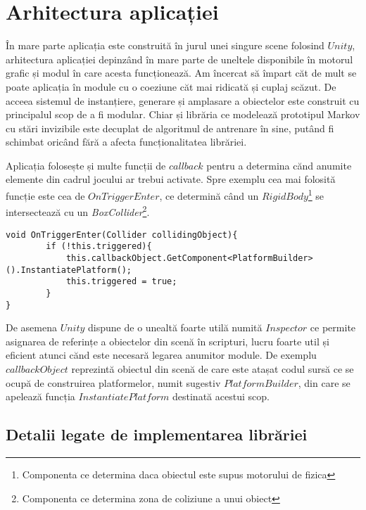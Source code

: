 \chapter{Arhitectura aplicației}

În mare parte aplicația este construită în jurul unei singure scene folosind $Unity$, arhitectura aplicației depinzând în mare parte de uneltele disponibile în motorul grafic și modul în care acesta funcționează. Am încercat să împart căt de mult se poate aplicația în module cu o coeziune căt mai ridicată și cuplaj scăzut. De acceea sistemul de instanțiere, generare și amplasare a obiectelor este construit cu principalul scop de a fi modular. Chiar și librăria ce modelează prototipul Markov cu stări invizibile este decuplat de algoritmul de antrenare în sine, putând fi schimbat oricând fără a afecta funcționalitatea librăriei.\par

Aplicația folosește și multe funcții de $callback$ pentru a determina cănd anumite elemente din cadrul jocului ar trebui activate. Spre exemplu cea mai folosită funcție este cea de $OnTriggerEnter$, ce determină când un $RigidBody$\footnote{Componenta ce determina daca obiectul este supus motorului de fizica} se intersectează cu un \textit{Box}\textit{Collider}\footnote{Componenta ce determina zona de coliziune a unui obiect}.\par

\begin{lstlisting}[caption=Exemplu de utilizare a functiei OnTriggerEnter]
void OnTriggerEnter(Collider collidingObject){
        if (!this.triggered){
            this.callbackObject.GetComponent<PlatformBuilder>().InstantiatePlatform();
            this.triggered = true;
        }
}
\end{lstlisting}
\par

De asemena $Unity$ dispune de o unealtă foarte utilă numită $Inspector$ ce permite asignarea de referințe a obiectelor din scenă în scripturi, lucru foarte util și eficient atunci cănd este necesară legarea anumitor module. De exemplu $callbackObject$ reprezintă obiectul din scenă de care este atașat codul sursă ce se ocupă de construirea platformelor, numit sugestiv $PlatformBuilder$, din care se apelează funcția $InstantiatePlatform$ destinată acestui scop.\par

\section{Detalii legate de implementarea librăriei}

